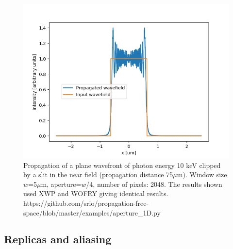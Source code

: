 \documentclass{iucr}              %
\newcommand{\ingreen}[1]{{\color{green}#1}}
\begin{document}
\begin{figure}
\label{fig: aperture_1D}
\caption{Propagation of a plane wavefront of photon energy 10 keV clipped by a slit in the near field (propagation distance 75$\mu$m). Window size $w$=5$\mu$m, aperture=$w$/4, number of pixels: 2048. 
The results shown used XWP and WOFRY giving identical results. 
\ingreen{ https://github.com/srio/propagation-free-space/blob/master/examples/aperture\_1D.py}
}
\includegraphics[width=1\textwidth]{aperture_1D.png}
\end{figure}


\subsection{Replicas and aliasing}
\end{document}
